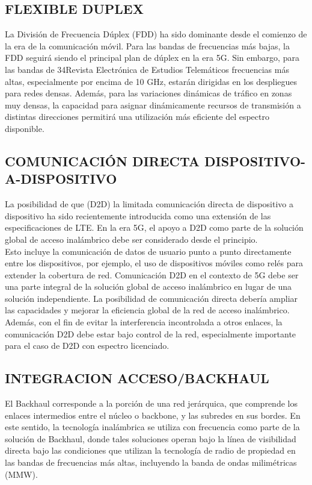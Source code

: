 \documentclass[]{article}
\begin{document}
\subsection{FLEXIBLE DUPLEX}
La División de Frecuencia Dúplex (FDD) ha sido dominante desde el comienzo de la
era de la comunicación móvil. Para las bandas de frecuencias más bajas, la FDD seguirá
siendo el principal plan de dúplex en la era 5G. Sin embargo, para las bandas de
34Revista Electrónica de
Estudios Telemáticos
frecuencias más altas, especialmente por encima de 10 GHz, estarán dirigidas en los
despliegues para redes densas. Además, para las variaciones dinámicas de tráfico en
zonas muy densas, la capacidad para asignar dinámicamente recursos de transmisión a
distintas direcciones permitirá una utilización más eficiente del espectro disponible.\\

\subsection{COMUNICACIÓN DIRECTA DISPOSITIVO-A-DISPOSITIVO
	}
	
	La posibilidad de que (D2D) la limitada comunicación directa de dispositivo a
dispositivo ha sido recientemente introducida como una extensión de las especificaciones
de LTE. En la era 5G, el apoyo a D2D como parte de la solución global de acceso
inalámbrico debe ser considerado desde el principio.\\

Esto incluye la comunicación de
datos de usuario punto a punto directamente entre los dispositivos, por ejemplo, el uso de
dispositivos móviles como relés para extender la cobertura de red. Comunicación D2D en
el contexto de 5G debe ser una parte integral de la solución global de acceso inalámbrico
en lugar de una solución independiente.
La posibilidad de comunicación directa debería ampliar las capacidades y mejorar la
eficiencia global de la red de acceso inalámbrico. Además, con el fin de evitar la
interferencia incontrolada a otros enlaces, la comunicación D2D debe estar bajo control de
la red, especialmente importante para el caso de D2D con espectro licenciado.\\

\subsection{INTEGRACION ACCESO/BACKHAUL}

El Backhaul corresponde a la porción de una red jerárquica, que comprende los
enlaces intermedios entre el núcleo o backbone, y las subredes en sus bordes. En este
sentido, la tecnología inalámbrica se utiliza con frecuencia como parte de la solución de
Backhaul, donde tales soluciones operan bajo la línea de visibilidad directa bajo las
condiciones que utilizan la tecnología de radio de propiedad en las bandas de frecuencias
más altas, incluyendo la banda de ondas milimétricas (MMW).\\
\end{document}
